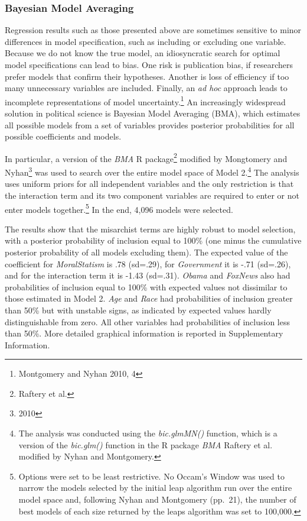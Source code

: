 \documentclass[12pt,]{article}
\begin{document}
\subsubsection{Bayesian Model Averaging}\label{bayesian-model-averaging}

Regression results such as those presented above are sometimes sensitive
to minor differences in model specification, such as including or
excluding one variable. Because we do not know the true model, an
idiosyncratic search for optimal model specifications can lead to bias.
One risk is publication bias, if researchers prefer models that confirm
their hypotheses. Another is loss of efficiency if too many unnecessary
variables are included. Finally, an \emph{ad hoc} approach leads to
incomplete representations of model uncertainty.\footnote{Montgomery and
  Nyhan 2010, 4} An increasingly widespread solution in political
science is Bayesian Model Averaging (BMA), which estimates all possible
models from a set of variables provides posterior probabilities for all
possible coefficients and models.

In particular, a version of the \emph{BMA} R package\footnote{Raftery et
  al. } modified by Mongtomery and Nyhan\footnote{2010} was used to
search over the entire model space of Model 2.\footnote{The analysis was
  conducted using the \emph{bic.glmMN()} function, which is a version of
  the \emph{bic.glm()} function in the R package \emph{BMA} Raftery et
  al. modified by Nyhan and Montgomery.} The analysis uses uniform
priors for all independent variables and the only restriction is that
the interaction term and its two component variables are required to
enter or not enter models together.\footnote{Options were set to be
  least restrictive. No Occam's Window was used to narrow the models
  selected by the initial leap algorithm run over the entire model space
  and, following Nyhan and Montgomery (pp.~21), the number of best
  models of each size returned by the leaps algorithm was set to
  100,000.} In the end, 4,096 models were selected.

The results show that the misarchist terms are highly robust to model
selection, with a posterior probability of inclusion equal to 100\% (one
minus the cumulative posterior probability of all models excluding
them). The expected value of the coefficient for \emph{MoralStatism} is
.78 (sd=.29), for \emph{Government} it is -.71 (sd=.26), and for the
interaction term it is -1.43 (sd=.31). \emph{Obama} and \emph{FoxNews}
also had probabilities of inclusion equal to 100\% with expected values
not dissimilar to those estimated in Model 2. \emph{Age} and \emph{Race}
had probabilities of inclusion greater than 50\% but with unstable
signs, as indicated by expected values hardly distinguishable from zero.
All other variables had probabilities of inclusion less than 50\%. More
detailed graphical information is reported in Supplementary Information.
\end{document}
